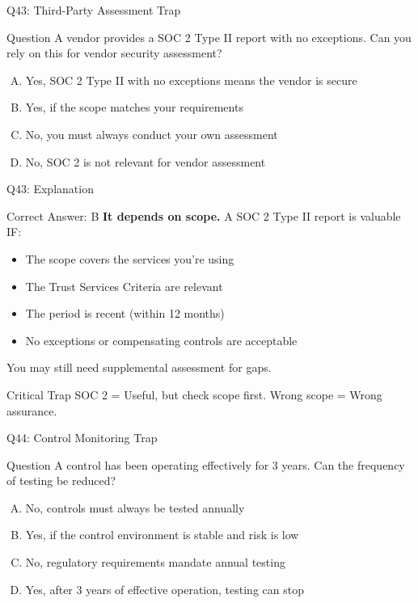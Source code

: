 \documentclass{beamer}
\begin{document}
	\begin{frame}{Q43: Third-Party Assessment Trap}
		\begin{block}{Question}
			A vendor provides a SOC 2 Type II report with no exceptions. Can you rely on this for vendor security assessment?
		\end{block}
		\begin{enumerate}[(A)]
			\item Yes, SOC 2 Type II with no exceptions means the vendor is secure
			\item Yes, if the scope matches your requirements
			\item No, you must always conduct your own assessment
			\item No, SOC 2 is not relevant for vendor assessment
		\end{enumerate}
	\end{frame}
	
	\begin{frame}{Q43: Explanation}
		\begin{block}{Correct Answer: B}
			\textbf{It depends on scope.} A SOC 2 Type II report is valuable IF:
			\begin{itemize}
				\item The scope covers the services you're using
				\item The Trust Services Criteria are relevant
				\item The period is recent (within 12 months)
				\item No exceptions or compensating controls are acceptable
			\end{itemize}
			You may still need supplemental assessment for gaps.
		\end{block}
		\begin{alertblock}{Critical Trap}
			SOC 2 = Useful, but check scope first.
			Wrong scope = Wrong assurance.
		\end{alertblock}
	\end{frame}
	
	\begin{frame}{Q44: Control Monitoring Trap}
		\begin{block}{Question}
			A control has been operating effectively for 3 years. Can the frequency of testing be reduced?
		\end{block}
		\begin{enumerate}[(A)]
			\item No, controls must always be tested annually
			\item Yes, if the control environment is stable and risk is low
			\item No, regulatory requirements mandate annual testing
			\item Yes, after 3 years of effective operation, testing can stop
		\end{enumerate}
	\end{frame}
	
\end{document}
